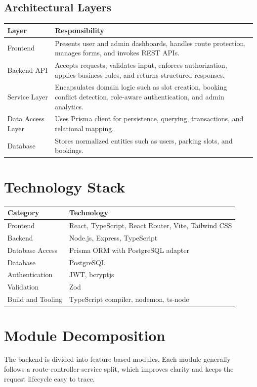 \documentclass[12pt,a4paper]{article}
\begin{document}
\subsection{Architectural Layers}
\begin{longtable}{p{} p{}}
\toprule
\textbf{Layer} & \textbf{Responsibility} \\
\midrule
Frontend & Presents user and admin dashboards, handles route protection, manages forms, and invokes REST APIs. \\
Backend API & Accepts requests, validates input, enforces authorization, applies business rules, and returns structured responses. \\
Service Layer & Encapsulates domain logic such as slot creation, booking conflict detection, role-aware authentication, and admin analytics. \\
Data Access Layer & Uses Prisma client for persistence, querying, transactions, and relational mapping. \\
Database & Stores normalized entities such as users, parking slots, and bookings. \\
\bottomrule
\end{longtable}

\section{Technology Stack}
\begin{longtable}{p{} p{}}
\toprule
\textbf{Category} & \textbf{Technology} \\
\midrule
Frontend & React, TypeScript, React Router, Vite, Tailwind CSS \\
Backend & Node.js, Express, TypeScript \\
Database Access & Prisma ORM with PostgreSQL adapter \\
Database & PostgreSQL \\
Authentication & JWT, bcryptjs \\
Validation & Zod \\
Build and Tooling & TypeScript compiler, nodemon, ts-node \\
\bottomrule
\end{longtable}

\section{Module Decomposition}
The backend is divided into feature-based modules. Each module generally follows a route-controller-service split, which improves clarity and keeps the request lifecycle easy to trace.
\end{document}
